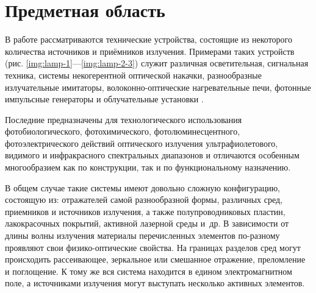 \section{Предметная область}

В работе рассматриваются технические устройства, состоящие из некоторого количества источников и приёмников излучения.
Примерами таких устройств (рис. \ref{img:lamp-1}—\ref{img:lamp-2-3}) служит различная осветительная, сигнальная техника, системы некогерентной оптической накачки, разнообразные излучательные имитаторы, волоконно-оптические нагревательные печи, фотонные импульсные генераторы и облучательные установки \cite{lighting-engineering, lasers, neodymium-glass-lasers, sarychev}.



Последние предназначены для технологического использования фотобиологического, фотохимического, фотолюминесцентного, фотоэлектрического действий оптического излучения ультрафиолетового, видимого и инфракрасного спектральных диапазонов и отличаются особенным многообразием как по конструкции, так и по функциональному назначению.

В общем случае такие системы имеют довольно сложную конфигурацию, состоящую из:
отражателей самой разнообразной формы, различных сред, приемников и источников излучения, а также полупроводниковых пластин, лакокрасочных покрытий, активной лазерной среды и~др.
В зависимости от длины волны излучения материалы перечисленных элементов по-разному проявляют свои физико-оптические свойства.
На границах разделов сред могут происходить рассеивающее, зеркальное или смешанное отражение, преломление и поглощение.
К тому же вся система находится в едином электромагнитном поле, а источниками излучения могут выступать несколько активных элементов.

